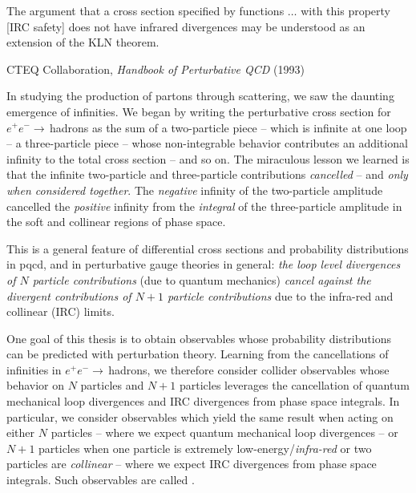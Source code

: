 \epigraph{
    The argument that a cross section specified by functions \(\dots\) with this property [IRC safety] does not have infrared divergences may be understood as an extension of the KLN theorem.
}{
    CTEQ Collaboration,
    \textit{Handbook of Perturbative QCD} (1993)
}

In studying the production of partons through scattering, we saw the daunting emergence of infinities.
%
We began by writing the perturbative cross section for \(e^+ e^- \to\,\)hadrons as the sum of a two-particle piece -- which is infinite at one loop -- a three-particle piece -- whose non-integrable behavior contributes an additional infinity to the total cross section -- and so on.
%
%
The miraculous lesson we learned is that the infinite two-particle and three-particle contributions \emph{cancelled} -- and \emph{only when considered together}.
%
The \textit{negative} infinity of the two-particle amplitude cancelled the \textit{positive} infinity from the \textit{integral} of the three-particle amplitude in the soft and collinear regions of phase space.

This is a general feature of differential cross sections and probability distributions in \gls{pqcd}, and in perturbative gauge theories in general:
%
\textit{the loop level divergences of \(N\) particle contributions} (due to quantum mechanics) \textit{cancel against the divergent contributions of \(N+1\) particle contributions} due to the infra-red and collinear (IRC) limits.

One goal of this thesis is to obtain observables whose probability distributions can be predicted with perturbation theory.
%
Learning from the cancellations of infinities in \(e^+ e^- \to\,\)hadrons, we therefore consider collider observables whose behavior on \(N\) particles and \(N+1\) particles leverages the cancellation of quantum mechanical loop divergences and IRC divergences from phase space integrals.
%
In particular, we consider observables which yield the same result when acting on either \(N\) particles -- where we expect quantum mechanical loop divergences -- or \(N+1\) particles when one particle is extremely low-energy/\emph{infra-red} or two particles are \emph{collinear} -- where we expect IRC divergences from phase space integrals.
%
Such observables are called .


